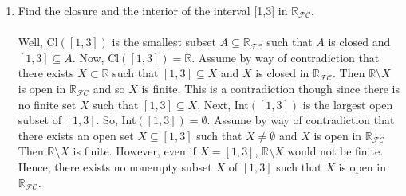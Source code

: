 \documentclass[12pt]{article}
\begin{document}
\begin{enumerate}
\item Find the closure and the interior of the interval [1,3] in $\mathbb{R}_{\mathcal{FC}}$.\\\\
Well, Cl$([1,3])$ is the smallest subset $A\subseteq\mathbb{R}_{\mathcal{FC}}$ such that $A$ is closed and $[1,3]\subseteq A$. Now, Cl$([1,3])=\mathbb{R}$. Assume by way of contradiction that there exists $X\subset\mathbb{R}$ such that $[1,3]\subseteq X$ and $X$ is closed in $\mathbb{R}_{\mathcal{FC}}$. Then $\mathbb{R}\setminus X$ is open in $\mathbb{R}_{\mathcal{FC}}$ and so $X$ is finite. This is a contradiction though since there is no finite set $X$ such that $[1,3]\subseteq X$. Next, Int$([1,3])$ is the largest open subset of $[1,3]$. So, Int$([1,3])=\emptyset$. Assume by way of contradiction that there exists an open set $X\subseteq[1,3]$ such that $X\neq\emptyset$ and $X$ is open in $\mathbb{R}_{\mathcal{FC}}$ Then $\mathbb{R}\setminus X$ is finite. However, even if $X=[1,3]$, $\mathbb{R}\setminus X$ would not be finite. Hence, there exists no nonempty subset $X$ of $[1,3]$ such that $X$ is open in $\mathbb{R}_{\mathcal{FC}}$.\\[20pt]


\end{enumerate}
\end{document}
